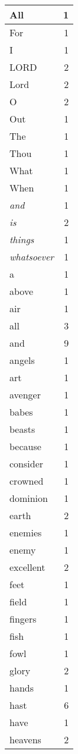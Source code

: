 \begin{center}
\begin{longtable}{l|r}
\hline \hline
\endlastfoot
All & 1 \\ \hline
For & 1 \\ \hline
I & 1 \\ \hline
LORD & 2 \\ \hline
Lord & 2 \\ \hline
O & 2 \\ \hline
Out & 1 \\ \hline
The & 1 \\ \hline
Thou & 1 \\ \hline
What & 1 \\ \hline
When & 1 \\ \hline
\emph{and} & 1 \\ \hline
\emph{is} & 2 \\ \hline
\emph{things} & 1 \\ \hline
\emph{whatsoever} & 1 \\ \hline
a & 1 \\ \hline
above & 1 \\ \hline
air & 1 \\ \hline
all & 3 \\ \hline
and & 9 \\ \hline
angels & 1 \\ \hline
art & 1 \\ \hline
avenger & 1 \\ \hline
babes & 1 \\ \hline
beasts & 1 \\ \hline
because & 1 \\ \hline
consider & 1 \\ \hline
crowned & 1 \\ \hline
dominion & 1 \\ \hline
earth & 2 \\ \hline
enemies & 1 \\ \hline
enemy & 1 \\ \hline
excellent & 2 \\ \hline
feet & 1 \\ \hline
field & 1 \\ \hline
fingers & 1 \\ \hline
fish & 1 \\ \hline
fowl & 1 \\ \hline
glory & 2 \\ \hline
hands & 1 \\ \hline
hast & 6 \\ \hline
have & 1 \\ \hline
heavens & 2 \\ \hline

\end{longtable}
\end{center}
